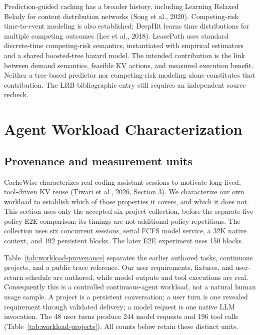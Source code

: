 \documentclass[sigconf, screen, review, balance=false]{acmart}
\begin{document}
Prediction-guided caching has a broader history, including Learning
Relaxed Belady for content distribution networks (Song et al., 2020).
Competing-risk time-to-event modeling is also established; DeepHit
learns time distributions for multiple competing outcomes (Lee et al.,
2018). LeasePath uses standard discrete-time competing-risk semantics,
instantiated with empirical estimators and a shared boosted-tree hazard
model. The intended contribution is the link between demand semantics,
feasible KV actions, and measured execution benefit. Neither a
tree-based predictor nor competing-risk modeling alone constitutes that
contribution. The LRB bibliographic entry still requires an independent
source recheck.


\section{Agent Workload Characterization}\label{workload-characterization}

\subsection{Provenance and measurement units}

CacheWise characterizes real coding-assistant sessions to motivate
long-lived, tool-driven KV reuse (Tiwari et al., 2026, Section 3).
We characterize our own workload to establish which of those properties
it covers, and which it does not. This section uses only the accepted
six-project collection, before the separate five-policy E2E comparison;
its timings are not additional policy repetitions. The collection uses
six concurrent sessions, serial FCFS model service, a 32K native context,
and 192 persistent blocks. The later E2E experiment uses 150 blocks.






Table~\ref{tab:workload-provenance} separates the earlier authored
tasks, continuous projects, and a public trace reference. Our user
requirements, fixtures, and user-return schedule are authored, while
model outputs and tool executions are real. Consequently this is a
controlled continuous-agent workload, not a natural human usage sample.
A project is a persistent conversation; a user turn is one revealed
requirement through validated delivery; a model request is one native
LLM invocation. The 48 user turns produce 244 model requests and 196
tool calls (Table~\ref{tab:workload-projects}). All counts below retain
these distinct units.
\end{document}
